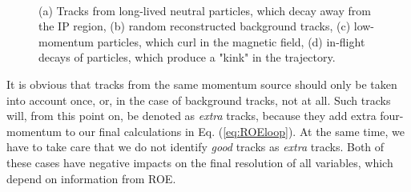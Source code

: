 \begin{figure}[H]
	\centering
	\\
	\captionsetup{width=.8\linewidth}
	\caption{(a) Tracks from long-lived neutral particles, which decay away from the IP region, (b) random reconstructed background tracks, (c) low-momentum particles, which curl in the magnetic field, (d) in-flight decays of particles, which produce a "kink" in the trajectory.}
	\label{fig:track_cleanup}
\end{figure}

It is obvious that tracks from the same momentum source should only be taken into account once, or, in the case of background tracks, not at all. Such tracks will, from this point on, be denoted as \textit{extra} tracks, because they add extra four-momentum to our final calculations in Eq. (\ref{eq:ROEloop}). At the same time, we have to take care that we do not identify \textit{good} tracks as \textit{extra} tracks. Both of these cases have negative impacts on the final resolution of all variables, which depend on information from ROE.

